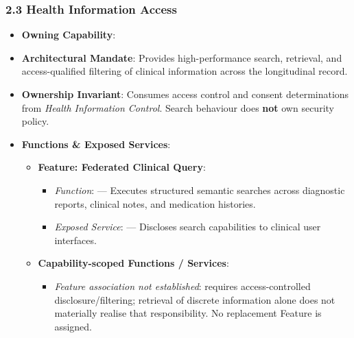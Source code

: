 \subsubsection*{2.3 Health Information Access}
\label{rad:ise:73}

\begin{itemize}

\item 
\textbf{Owning Capability}: \texttt{}



\item 
\textbf{Architectural Mandate}: Provides high-performance search, retrieval, and access-qualified filtering of clinical information across the longitudinal record.



\item 
\textbf{Ownership Invariant}: Consumes access control and consent determinations from \emph{Health Information Control}. Search behaviour does \textbf{not} own security policy.



\item 
\textbf{Functions \& Exposed Services}:


\begin{itemize}

\item 
\textbf{Feature: Federated Clinical Query}:


\begin{itemize}

\item 
\emph{Function}: \texttt{} — Executes structured semantic searches across diagnostic reports, clinical notes, and medication histories.



\item 
\emph{Exposed Service}: \texttt{} — Discloses search capabilities to clinical user interfaces.



\end{itemize}


\item 
\textbf{Capability-scoped Functions /\allowbreak{} Services}:


\begin{itemize}

\item 
\emph{Feature association not established}: \texttt{} requires access-controlled disclosure/\allowbreak{}filtering; retrieval of discrete information alone does not materially realise that responsibility. No replacement Feature is assigned.




\end{itemize}
\end{itemize}
\end{itemize}
